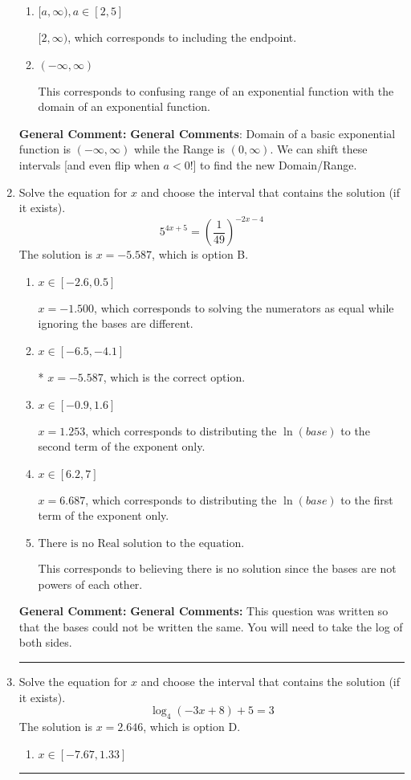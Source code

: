 \documentclass{extbook}[14pt]
\newcommand{\litem}[1]{\item #1

\rule{\textwidth}{0.4pt}}
\begin{document}
\begin{enumerate}
{\begin{enumerate}[label=\Alph*.]
$(-\infty, -2)$, which corresponds to using the negative vertical shift AND flipping the Range interval.
\item \( [a, \infty), a \in [2, 5] \)

$[2, \infty)$, which corresponds to including the endpoint.
\item \( (-\infty, \infty) \)

This corresponds to confusing range of an exponential function with the domain of an exponential function.
\end{enumerate}

\textbf{General Comment:} \textbf{General Comments}: Domain of a basic exponential function is $(-\infty, \infty)$ while the Range is $(0, \infty)$. We can shift these intervals [and even flip when $a<0$!] to find the new Domain/Range.
}
\litem{
Solve the equation for $x$ and choose the interval that contains the solution (if it exists).
\[ 5^{4x+5} = \left(\frac{1}{49}\right)^{-2x-4} \]The solution is \( x = -5.587 \), which is option B.\begin{enumerate}[label=\Alph*.]
\item \( x \in [-2.6, 0.5] \)

$x = -1.500$, which corresponds to solving the numerators as equal while ignoring the bases are different.
\item \( x \in [-6.5, -4.1] \)

* $x = -5.587$, which is the correct option.
\item \( x \in [-0.9, 1.6] \)

$x = 1.253$, which corresponds to distributing the $\ln(base)$ to the second term of the exponent only.
\item \( x \in [6.2, 7] \)

$x = 6.687$, which corresponds to distributing the $\ln(base)$ to the first term of the exponent only.
\item \( \text{There is no Real solution to the equation.} \)

This corresponds to believing there is no solution since the bases are not powers of each other.
\end{enumerate}

\textbf{General Comment:} \textbf{General Comments:} This question was written so that the bases could not be written the same. You will need to take the log of both sides.
}
\litem{
Solve the equation for $x$ and choose the interval that contains the solution (if it exists).
\[ \log_{4}{(-3x+8)}+5 = 3 \]The solution is \( x = 2.646 \), which is option D.\begin{enumerate}[label=\Alph*.]
\item \( x \in [-7.67, 1.33] \)


\end{enumerate}}
\end{enumerate}
\end{document}
